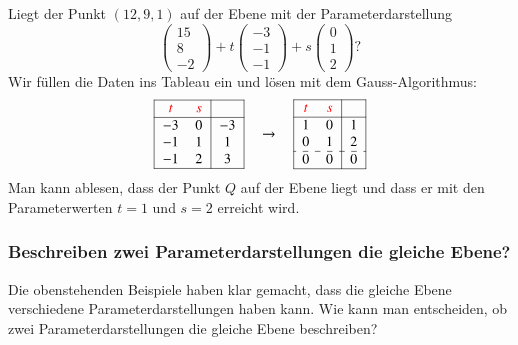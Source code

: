 \begin{beispiel}
Liegt der Punkt $(12,9,1)$ auf der Ebene mit der Parameterdarstellung
\[
\begin{pmatrix}15\\8\\-2\end{pmatrix}
+t
\begin{pmatrix}-3\\-1\\-1\end{pmatrix}
+s
\begin{pmatrix}0\\1\\2\end{pmatrix}
?
\]
\smallskip
Wir füllen die Daten ins Tableau ein und lösen mit dem Gauss-Algorithmus:
\[
\begin{tabular}{|>{$}c<{$}>{$}c<{$}|>{$}c<{$}|}
\hline
\color{red}t&\color{red}s&\\
\hline
-3& 0&-3\\
-1& 1& 1\\
-1& 2& 3\\
\hline
\end{tabular}
\quad\rightarrow\quad
\begin{tabular}{|>{$}c<{$}>{$}c<{$}|>{$}c<{$}|}
\hline
\color{red}t&\color{red}s&\\
\hline
   1&  0&  1\\
   0&  1&  2\\
\hdashline
   0&  0&  0\\
\hline
\end{tabular}
\]
Man kann ablesen, dass der Punkt $Q$ auf der Ebene liegt und dass
er mit den Parameterwerten $t=1$ und $s=2$ erreicht wird.
\end{beispiel}

\subsubsection{Beschreiben zwei Parameterdarstellungen die gleiche Ebene?}
Die obenstehenden Beispiele haben klar gemacht, dass die gleiche Ebene
verschiedene Parameterdarstellungen haben kann.
Wie kann man entscheiden, ob zwei Parameterdarstellungen die gleiche
Ebene beschreiben?

